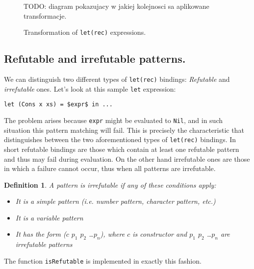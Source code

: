\documentclass[12pt,a4paper]{report}
\newtheorem{definition}{Definition}[chapter]
\begin{document}
\begin{figure}[h!]
  \centering

  TODO: diagram pokazujacy w jakiej kolejnosci sa aplikowane transformacje.

  \caption{Transformation of \texttt{let(rec)} expressions.}
  \label{fig:letrec_transform}
\end{figure}

\subsection{Refutable and irrefutable patterns.}
\label{sec:irrefutable_patterns}
We can distinguish two different types of \texttt{let(rec)} bindings:
\textit{Refutable} and \textit{irrefutable} ones. Let's look at this sample
\texttt{let} expression:

\hspace*{-1.5in}
\begin{lstlisting}[style=haskell,mathescape=true,label=lst:conformality_check,caption={Pattern matching \texttt{let} binding.}]
let (Cons x xs) = $expr$ in ...
\end{lstlisting}
The problem arises because \texttt{expr} might be evaluated to \texttt{Nil},
and in such situation this pattern matching will fail. This is precisely the
characteristic that distinguishes between the two aforementioned types of
\texttt{let(rec)} bindings. In short refutable bindings are those which contain
at least one refutable pattern and thus may fail during evaluation. On the
other hand irrefutable ones are those in which a failure cannot occur, thus
when all patterns are irrefutable.

\begin{definition}
  \label{def:irrefutable_pattern}
  A pattern is irrefutable if any of these conditions apply:
  \begin{itemize}
    \item It is a simple pattern (i.e. number pattern, character pattern, etc.)
    \item It is a variable pattern
    \item It has the form ($c$ $p_{1}$ $p_{2}$ \ldots $p_{n}$), where $c$ is
      constructor and $p_{1}$ $p_{2}$ \ldots $p_{n}$ are irrefutable patterns
  \end{itemize}
\end{definition}
The function \texttt{isRefutable} is implemented in exactly this fashion.
\end{document}
